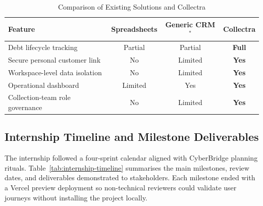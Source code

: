 \documentclass[12pt,a4paper]{report}
\begin{document}
\begin{table}[H]
  \centering
  \small
  \renewcommand{\arraystretch}{1.3}
  \setlength{\tabcolsep}{6pt}
  \begin{tabular}{l c c c}
    \hline
    \rowcolor{accentblue!10}
    \textbf{Feature} & \textbf{Spreadsheets} & \textbf{Generic CRM}$^{\ast}$ & \textbf{Collectra} \\
    \hline
    Debt lifecycle tracking          & Partial & Partial & \textbf{Full} \\
    \hline
    Secure personal customer link    & No      & Limited & \textbf{Yes} \\
    \hline
    Workspace-level data isolation   & No      & Limited & \textbf{Yes} \\
    \hline
    Operational dashboard            & Limited & Yes     & \textbf{Yes} \\
    \hline
    Collection-team role governance  & No      & Limited & \textbf{Yes} \\
    \hline
  \end{tabular}
  \caption{Comparison of Existing Solutions and Collectra}
  \label{tab:comparison}
\end{table}

\subsection{Internship Timeline and Milestone Deliverables}

The internship followed a four-sprint calendar aligned with CyberBridge planning rituals.
Table~\ref{tab:internship-timeline} summarises the main milestones, review dates, and
deliverables demonstrated to stakeholders.
Each milestone ended with a Vercel preview deployment so non-technical reviewers could
validate user journeys without installing the project locally.
\end{document}

